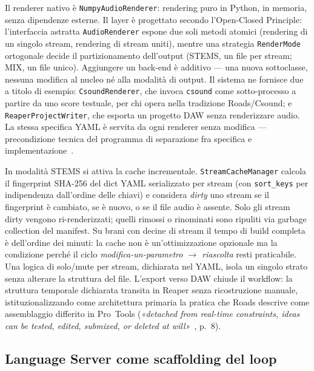 \documentclass[10pt,twocolumn,a4paper]{article}
\begin{document}
Il renderer nativo è \texttt{NumpyAudioRenderer}: rendering puro in
Python, in memoria, senza dipendenze esterne. Il layer è progettato
secondo l'Open-Closed Principle: l'interfaccia astratta
\texttt{AudioRenderer} espone due soli metodi atomici (rendering di un
singolo stream, rendering di stream uniti), mentre una strategia
\texttt{RenderMode} ortogonale decide il partizionamento dell'output
(STEMS, un file per stream; MIX, un file unico). Aggiungere un back-end
è additivo --- una nuova sottoclasse, nessuna modifica al nucleo né alla
modalità di output. Il sistema ne fornisce due a titolo di esempio:
\texttt{CsoundRenderer}, che invoca \texttt{csound} come sotto-processo
a partire da uno score testuale, per chi opera nella tradizione
Roads/Csound; e \texttt{ReaperProjectWriter}, che esporta un progetto
DAW senza renderizzare audio. La stessa specifica YAML è servita da ogni
renderer senza modifica --- precondizione tecnica del programma di
separazione fra specifica e implementazione~\cite{Markidis2024cim}.

In modalità STEMS si attiva la cache incrementale.
\texttt{StreamCacheManager} calcola il fingerprint SHA-256 del dict YAML
serializzato per stream (con \texttt{sort\_keys} per indipendenza
dall'ordine delle chiavi) e considera \emph{dirty} uno stream se il
fingerprint è cambiato, se è nuovo, o se il file audio è assente. Solo
gli stream dirty vengono ri-renderizzati; quelli rimossi o rinominati
sono ripuliti via garbage collection del manifest. Su brani con decine
di stream il tempo di build completa è dell'ordine dei minuti: la cache
non è un'ottimizzazione opzionale ma la condizione perché il ciclo
\emph{modifica-un-parametro $\to$ riascolta} resti praticabile. Una
logica di solo/mute per stream, dichiarata nel YAML, isola un singolo
strato senza alterare la struttura del file. L'export verso DAW chiude
il workflow: la struttura temporale dichiarata transita in Reaper senza
ricostruzione manuale, istituzionalizzando come architettura primaria
la pratica che Roads descrive come assemblaggio differito in Pro~Tools
(\emph{«detached from real-time constraints, ideas can be tested,
edited, submixed, or deleted at will»}~\cite{Roads2012}, p.~8).

\subsection{Language Server come scaffolding del loop}
\end{document}
